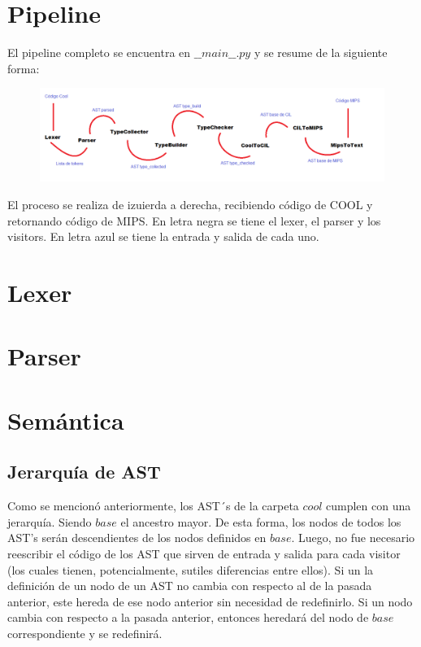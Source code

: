 \documentclass[a4paper,12pt]{article}
\begin{document}
\section*{Pipeline}

El pipeline completo se encuentra en $\_\_main\_\_.py$ y se resume de la siguiente forma:\\

\begin{figure}[H]
\centering
\includegraphics[width=0.9\linewidth]{./4}
\caption{}
\label{fig:4}
\end{figure}

El proceso se realiza de izuierda a derecha, recibiendo código de COOL y retornando código de MIPS. En letra negra se tiene el lexer, el parser y los visitors. En letra azul se tiene la entrada y salida de cada uno.

\section*{Lexer}

\section*{Parser}

\section*{Semántica}

\subsection*{Jerarquía de AST}
Como se mencionó anteriormente, los AST´s de la carpeta $cool$ cumplen con una jerarquía. Siendo $base$ el ancestro mayor. De esta forma, los nodos de todos los AST's serán descendientes de los nodos definidos en $base$. Luego, no fue necesario reescribir el código de los AST que sirven de entrada y salida para cada visitor (los cuales tienen, potencialmente, sutiles diferencias entre ellos). Si un la definición de un nodo de un AST no cambia con respecto al de la pasada anterior, este hereda de ese nodo anterior sin necesidad de redefinirlo. Si un nodo cambia con respecto a la pasada anterior, entonces heredará del nodo de $base$ correspondiente y se redefinirá.\\
\end{document}
